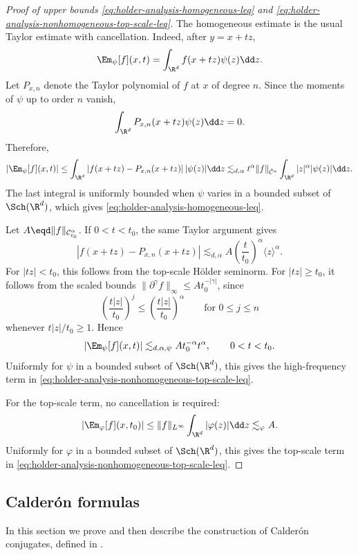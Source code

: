 \begin{proof}[Proof of upper bounds \eqref{eq:holder-analysis-homogeneous-leq} and \eqref{eq:holder-analysis-nonhomogeneous-top-scale-leq}] The homogeneous estimate is the usual Taylor estimate with cancellation.
Indeed, after \(y=x+tz\),
\[
\Em_\psi[f](x,t)=\int_{\R^d} f(x+tz)\psi(z)\dd z.
\]
Let \(P_{x,n}\) denote the Taylor polynomial of \(f\) at \(x\) of degree \(n\).
Since the moments of \(\psi\) up to order \(n\) vanish,
\[
\int_{\R^d} P_{x,n}(x+tz)\psi(z)\dd z=0.
\]
Therefore,
\[
|\Em_\psi[f](x,t)|
\le
\int_{\R^d}|f(x+tz)-P_{x,n}(x+tz)|\,|\psi(z)|\dd z
\lesssim_{d,\alpha}
t^\alpha\|f\|_{\dot{\mathcal{C}}^\alpha}
\int_{\R^d}|z|^\alpha|\psi(z)|\dd z.
\]
The last integral is uniformly bounded when \(\psi\) varies in a bounded subset of \(\Sch(\R^d)\), which gives \eqref{eq:holder-analysis-homogeneous-leq}.

Let \(A\eqd \|f\|_{\mathcal{C}^{\alpha}_{t_0}}\).
If \(0<t<t_0\), the same Taylor argument gives
\[
|f(x+tz)-P_{x,n}(x+tz)|
\lesssim_{d,\alpha}
A \left(\frac{t}{t_0}\right)^\alpha
\langle z\rangle^\alpha .
\]
For \(|tz|<t_0\), this follows from the top-scale H{\"o}lder seminorm.
For \(|tz|\ge t_0\), it follows from the scaled bounds \(\|\partial^\gamma f\|_\infty\le A t_0^{-|\gamma|}\), since
\[
\left(\frac{t|z|}{t_0}\right)^j
\le
\left(\frac{t|z|}{t_0}\right)^\alpha
\qquad
\text{for } 0\le j\le n
\]
whenever \(t|z|/t_0\ge1\).
Hence
\[
|\Em_\psi[f](x,t)|
\lesssim_{d,\alpha,\psi}
A t_0^{-\alpha} t^\alpha ,
\qquad 0<t<t_0.
\]
Uniformly for \(\psi\) in a bounded subset of \(\Sch(\R^d)\), this gives the high-frequency term in \eqref{eq:holder-analysis-nonhomogeneous-top-scale-leq}.

For the top-scale term, no cancellation is required:
\[
|\Em_\varphi[f](x,t_0)|
\le
\|f\|_{L^\infty}\int_{\R^d}|\varphi(z)|\dd z
\lesssim_{\varphi} A.
\]
Uniformly for \(\varphi\) in a bounded subset of \(\Sch(\R^d)\), this gives the top-scale term in \eqref{eq:holder-analysis-nonhomogeneous-top-scale-leq}.
\end{proof}

\subsection{Calder{\'o}n formulas}\label{sec:Calderon-formula}
In this section we prove  and then describe the construction of Calderón conjugates, defined in .

